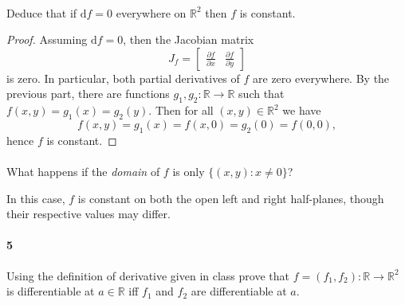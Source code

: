 \documentclass[12pt]{article}
\newlength{\myparskip}
\newenvironment{fullbox}{\begin{lrbox}{\savefullbox}\begin{minipage}{\dimexpr\textwidth-2\fboxsep\relax}\setlength{\parskip}{\myparskip}}{\end{minipage}\end{lrbox}\framebox[\textwidth]{\usebox{\savefullbox}}}
\newenvironment{pbox}[1][]{\begin{fullbox}\ifx#1\empty\else\paragraph{#1}\phantom{}\fi}{\end{fullbox}}
\theoremstyle{definition}
\newcommand{\R}{\mathbb{R}}
\newcommand{\<}{\langle}
\renewcommand{\>}{\rangle}
\newcommand{\dd}{\mathrm{d}}
\newcommand{\pdv}[2]{\frac{\partial #1}{\partial #2}}
\newcommand{\mat}[1]{\begin{bmatrix}#1\end{bmatrix}}
\begin{document}
\begin{pbox}
    Deduce that if $\dd{f} = 0 $ everywhere on $\R^2$ then $f$ is constant.
\end{pbox}

\begin{proof}
    Assuming $\dd{f} = 0$, then the Jacobian matrix
    \[
        J_f = \mat{\pdv{f}{x} & \pdv{f}{y}}            
    \]
    is zero.
    In particular, both partial derivatives of $f$ are zero everywhere.
    By the previous part, there are functions $g_1, g_2 : \R \to \R$ such that $f(x, y) = g_1(x) = g_2(y)$.
    Then for all $(x, y) \in \R^2$ we have
    \[
        f(x, y) = g_1(x) = f(x, 0) = g_2(0) = f(0, 0),
    \]
    hence $f$ is constant.
\end{proof}

\begin{pbox}
    What happens if the \textit{domain} of $f$ is only $\{(x, y) : x \ne 0\}$?
\end{pbox}

In this case, $f$ is constant on both the open left and right half-planes, though their respective values may differ.

\begin{pbox}[5]
    Using the definition of derivative given in class prove that $f = (f_1, f_2): \R \to \R^2$ is differentiable at $a \in \R$ iff $f_1$ and $f_2$ are differentiable at $a$.
\end{pbox}
\end{document}
